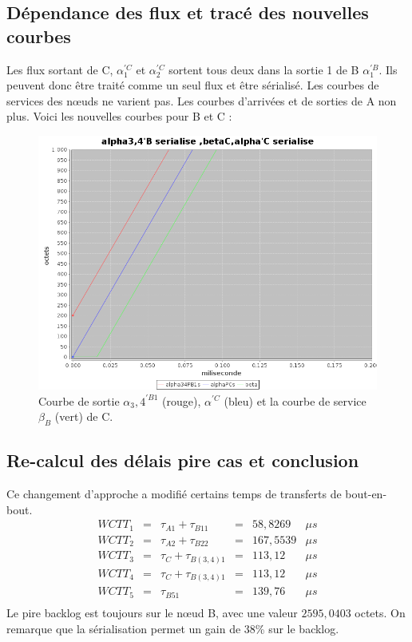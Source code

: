 \subsection{Dépendance des flux et tracé des nouvelles courbes}
Les flux sortant de C, $\alpha_1^{'C}$ et $\alpha_2^{'C}$ sortent tous deux dans la sortie 1 de B $\alpha_1^{'B}$. Ils peuvent donc être traité comme un seul flux et être sérialisé.
Les courbes de services des n\oe uds ne varient pas. Les courbes d'arrivées et de sorties de A non plus.
Voici les nouvelles courbes pour B et C :
\begin{figure}[!ht]%
\centering%
\noindent\includegraphics[width = .6\textwidth]{./II/images/alphaSerialise.png}%
\caption{\label{fig:alphaSerialise}Courbe de sortie $\alpha_3,4^{'B1}$ (rouge), $\alpha^{'C}$ (bleu) et la courbe de service $\beta_B$ (vert) de C.}%
\end{figure}

\subsection{Re-calcul des délais pire cas et conclusion}
Ce changement d'approche a modifié certains temps de transferts de bout-en-bout. 
\begin{equation}
\begin{array}{lclcll}
WCTT_1	&=&	\tau_{A1} + \tau_{B11} 	&=& 58,8269&\mu s\\
WCTT_2	&=&	\tau_{A2} + \tau_{B22} 	&=& 167,5539&\mu s\\
WCTT_3	&=&	\tau_{C} + \tau_{B(3,4)1} 	&=& 113,12&\mu s\\
WCTT_4	&=&	\tau_{C} + \tau_{B(3,4)1} &=& 113,12	&\mu s\\
WCTT_5	&=&	\tau_{B51} 				&=& 139,76	&\mu s\\
\end{array}
\end{equation}
Le pire backlog est toujours sur le n\oe ud B, avec une valeur $2595,0403$ octets.
On remarque que la sérialisation permet un gain de 38\% sur le backlog.

